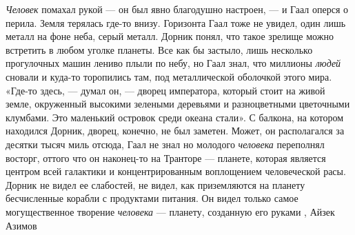 \emph{Человек} помахал рукой — он был явно благодушно настроен, — и Гаал оперся о
перила. Земля терялась где-то внизу. Горизонта Гаал тоже не увидел, один лишь
металл на фоне неба, серый металл. Дорник понял, что такое зрелище можно
встретить в любом уголке планеты. Все как бы застыло, лишь несколько
прогулочных машин лениво плыли по небу, но Гаал знал, что миллионы \emph{людей}
сновали и куда-то торопились там, под металлической оболочкой этого мира.
«Где-то здесь, — думал он, — дворец императора, который стоит на живой земле,
окруженный высокими зелеными деревьями и разноцветными цветочными клумбами. Это
маленький островок среди океана стали». С балкона, на котором находился Дорник,
дворец, конечно, не был заметен. Может, он располагался за десятки тысяч миль
отсюда, Гаал не знал но молодого \emph{человека} переполнял восторг, оттого что он
наконец-то на Транторе — планете, которая является центром всей галактики и
концентрированным воплощением человеческой расы. Дорник не видел ее слабостей,
не видел, как приземляются на планету бесчисленные корабли с продуктами
питания. Он видел только самое могущественное творение \emph{человека} — планету,
созданную его руками
, Айзек Азимов
